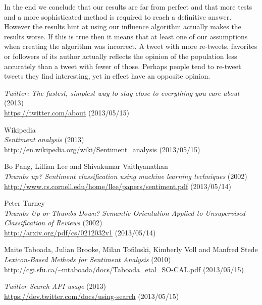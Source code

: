 \documentclass[a4paper,12pt]{report}
\begin{document}
In the end we conclude that our results are far from perfect and that more tests and a more sophisticated method is required to reach a definitive answer. However the results hint at using our influence algorithm actually makes the results worse. If this is true then it means that at least one of our assumptions when creating the algorithm was incorrect. A tweet with more re-tweets, favorites or followers of its author actually reflects the opinion of the population less accurately than a tweet with fewer of those. Perhaps people tend to re-tweet tweets they find interesting, yet in effect have an opposite opinion.
\begin{thebibliography}{200}

\vspace{-1.5cm}
  \emph{Twitter: The fastest, simplest way to stay close to everything you care about} (2013)\\
  \url{https://twitter.com/about} (2013/05/15)

  Wikipedia\\
  \emph{Sentiment analysis} (2013)\\
  \url{http://en.wikipedia.org/wiki/Sentiment_analysis} (2013/05/15)

  Bo Pang, Lillian Lee and Shivakumar Vaithyanathan\\
  \emph{Thumbs up? Sentiment classification using machine learning techniques} (2002)\\
  \url{http://www.cs.cornell.edu/home/llee/papers/sentiment.pdf} (2013/05/14)

  Peter Turney\\
  \emph{Thumbs Up or Thumbs Down? Semantic Orientation Applied to Unsupervised Classification of Reviews} (2002)\\
  \url{http://arxiv.org/pdf/cs/0212032v1} (2013/05/14)

  Maite Taboada, Julian Brooke, Milan Tofiloski, Kimberly Voll and Manfred Stede\\
  \emph{Lexicon-Based Methods for Sentiment Analysis} (2010)\\
  \url{http://cgi.sfu.ca/~mtaboada/docs/Taboada_etal_SO-CAL.pdf} (2013/05/15)

  \emph{Twitter Search API usage} (2013)\\
  \url{https://dev.twitter.com/docs/using-search} (2013/05/15)


\end{thebibliography}
\end{document}
